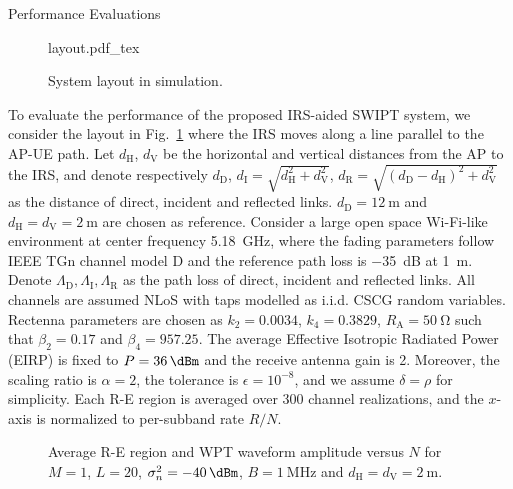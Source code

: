 \documentclass[journal]{IEEEtran}
\begin{document}
	\begin{section}{Performance Evaluations}\label{se:performance_evaluation}
		\begin{figure}[!t]
			\centering
			\def\svgwidth{0.9\columnwidth}
			{layout.pdf_tex}
			\caption{System layout in simulation.}
			\label{fi:layout}
		\end{figure}

		To evaluate the performance of the proposed IRS-aided SWIPT system, we consider the layout in Fig.~\ref{fi:layout} where the IRS moves along a line parallel to the AP-UE path. Let $d_{\mathrm{H}}$, $d_{\mathrm{V}}$ be the horizontal and vertical distances from the AP to the IRS, and denote respectively $d_{\mathrm{D}}$, $d_{\mathrm{I}}=\sqrt{d_{\mathrm{H}}^2+d_{\mathrm{V}}^2}$, $d_{\mathrm{R}}=\sqrt{(d_{\mathrm{D}}-d_{\mathrm{H}})^2+d_{\mathrm{V}}^2}$ as the distance of direct, incident and reflected links. $d_{\mathrm{D}}=\SI{12}{\meter}$ and $d_{\mathrm{H}}=d_{\mathrm{V}}=\SI{2}{\meter}$ are chosen as reference. Consider a large open space Wi-Fi-like environment at center frequency \SI{5.18}{\GHz}, where the fading parameters follow IEEE TGn channel model D \cite{Erceg2004} and the reference path loss is \SI{-35}{\dB} at \SI{1}{\meter}. Denote $\Lambda_{\mathrm{D}},\Lambda_{\mathrm{I}},\Lambda_{\mathrm{R}}$ as the path loss of direct, incident and reflected links. All channels are assumed NLoS with taps modelled as i.i.d. CSCG random variables. Rectenna parameters are chosen as $k_2=0.0034$, $k_4=0.3829$, $R_{\mathrm{A}}=\SI{50}{\ohm}$ such that $\beta_2=0.17$ and $\beta_4=957.25$. The average Effective Isotropic Radiated Power (EIRP) is fixed to $P=\SI{36}{\dBm}$ and the receive antenna gain is \SI{2}{\dBi}. Moreover, the scaling ratio is $\alpha=2$, the tolerance is $\epsilon=10^{-8}$, and we assume $\delta=\rho$ for simplicity. Each R-E region is averaged over \num{300} channel realizations, and the $x$-axis is normalized to per-subband rate $R/N$.

		\begin{figure}[!t]
			\centering
			\caption{Average R-E region and WPT waveform amplitude versus $N$ for $M=1$, $L=20$, $\sigma_n^2=\SI{-40}{\dBm}$, $B=\SI{1}{\MHz}$ and $d_{\mathrm{H}}=d_{\mathrm{V}}=\SI{2}{\meter}$.}
		\end{figure}


\end{section}
\end{document}
